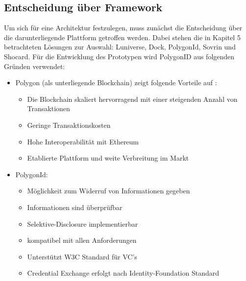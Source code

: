 \subsection{Entscheidung über Framework}
Um sich für eine Architektur festzulegen, muss zunächst die Entscheidung über die darunterliegende Plattform getroffen werden. Dabei stehen die in Kapitel 5 betrachteten Lösungen zur Auswahl: Luniverse, Dock, PolygonId, Sovrin und Shocard. Für die Entwicklung des Prototypen wird PolygonID aus folgenden Gründen verwendet:
\begin{itemize}
	
	\item Polygon (als unterliegende Blockchain) zeigt folgende Vorteile auf \cite{ID54}:
	\begin{itemize}
		\item Die Blockchain skaliert hervorragend mit einer steigenden Anzahl von Transaktionen
		\item Geringe Transaktionskosten
		\item Hohe Interoperabilität mit Ethereum
		\item Etablierte Plattform und weite Verbreitung im Markt
	\end{itemize}
	
	\item PolygonId:
	\begin{itemize}
		\item Möglichkeit zum Widerruf von Informationen gegeben
		\item Informationen sind überprüfbar
		\item Selektive-Disclosure implementierbar
		\item kompatibel mit allen Anforderungen
		\item Unterstützt W3C Standard für VC's
		\item Credential Exchange erfolgt nach Identity-Foundation Standard
	\end{itemize}
\end{itemize}

